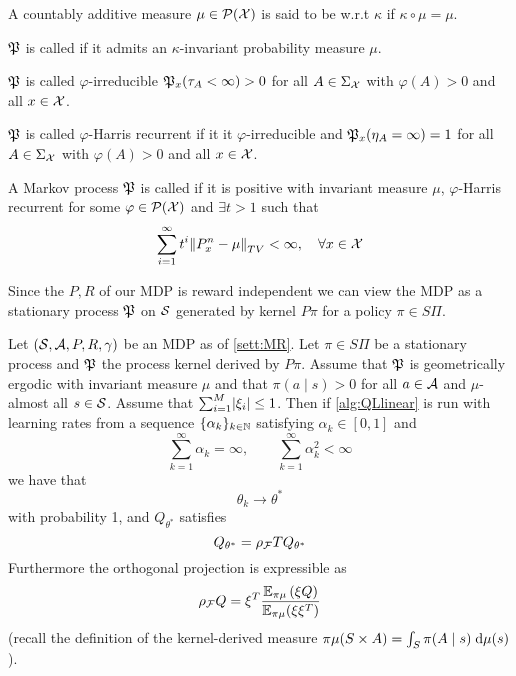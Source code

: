 \begin{defn}
  A countably additive measure $\mu \in \mathcal{P}(\mathcal{X})$ is said
  to be  w.r.t $\kappa$ if $\kappa \circ \mu = \mu$.
\end{defn}

\begin{defn}[Positivity]
  \leavevmode

  $\mathfrak{P}$ is called  if it admits an $\kappa$-invariant
  probability measure $\mu$.
\end{defn}

\begin{defn}[Irreducibility]
  $\mathfrak{P}$ is called $\varphi$-irreducible
  $\mathfrak{P}_x(\tau_A < \infty) > 0$
  for all $A \in \Sigma_\mathcal{X}$
  with $\varphi(A) > 0$
  and all $x \in \mathcal{X}$.
\end{defn}

\begin{defn}
  $\mathfrak{P}$ is called $\varphi$-Harris recurrent if
  it it $\varphi$-irreducible and
  $\mathfrak{P}_x(\eta_A = \infty) = 1$ for all $A \in \Sigma_\mathcal{X}$ with
  $\varphi(A) > 0$ and all $x \in \mathcal{X}$.
\end{defn}

\begin{defn}
  A Markov process $\mathfrak{P}$ is called  if
  it is positive with invariant measure $\mu$, $\varphi$-Harris recurrent
  for some $\varphi \in \mathcal{P}(\mathcal{X})$ and $\exists t>1$ such that
  \[ \sum_{i=1}^\infty t^i \norm{P^n_x - \mu}_{TV} < \infty,
  \quad \forall x \in \mathcal{X} \]
\end{defn}

Since the $P,R$ of our MDP is reward independent we can view the
MDP as a stationary process $\mathfrak{P}$ on $\mathcal{S}$
generated by kernel $P\pi$ for a policy $\pi \in S\Pi$.

\begin{thm}
  Let $(\mathcal{S}, \mathcal{A}, P, R, \gamma)$ be an MDP as of \cref{sett:MR}.
  Let $\pi \in S\Pi$ be a stationary process
  and $\mathfrak{P}$ the process kernel derived by $P\pi$.
  Assume that $\mathfrak{P}$ is geometrically ergodic with invariant
  measure $\mu$ and that
  $\pi(a \mid s) > 0$ for all $a \in \mathcal{A}$ and $\mu$-almost all
  $s \in \mathcal{S}$.
  Assume that $\sum_{i=1}^M \abs{\xi_i} \leq 1$.
  Then if \cref{alg:QLlinear} is run with learning rates from a sequence
  $\{ \alpha_k \}_{k \in \mathbb{N}}$ satisfying $\alpha_k \in [0,1]$ and
  \[ \sum_{k = 1}^\infty \alpha_k = \infty, \qquad
  \sum_{k = 1}^\infty \alpha_k^2 < \infty \]
  we have that
  \[ \theta_k \to \theta^* \]
  with probability 1, and $Q_{\theta^*}$ satisfies
  \[ Q_{\theta^*} = \rho_\mathcal{F} T Q_{\theta^*} \]
  Furthermore the orthogonal projection is expressible as
  \[ \rho_\mathcal{F} Q = \xi^T
    \frac{\mathbb{E}_{\pi\mu}\left( \xi Q \right)}{\mathbb{E}_{\pi\mu} (\xi \xi^T)}
  \]
  (recall the definition of the kernel-derived measure $\pi \mu(S \times A)
  = \int_S \pi(A \mid s) \; \mathrm{d} \mu(s)$).
  \label{thm:MeloRibeiro}
\end{thm}


